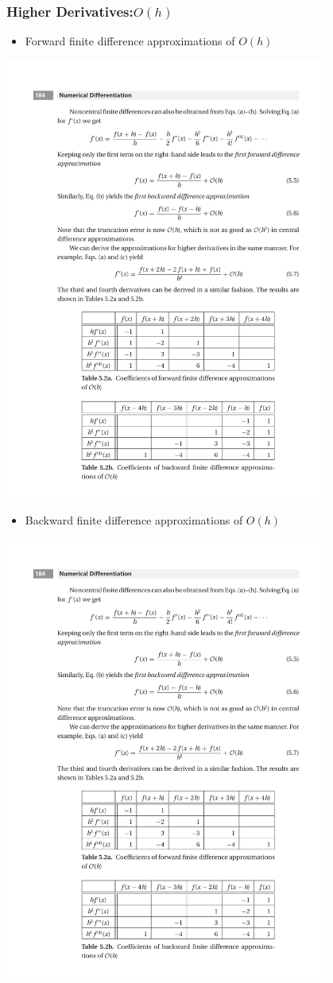 \documentclass{beamer}
\begin{document}
\begin{frame}[fragile]
\frametitle{Higher Derivatives:$O(h)$}

\begin{itemize}
\item Forward finite difference approximations of $O(h)$
\end{itemize}
\centerline{\includegraphics[width=0.8\textwidth]{Lec9_Tab1}}
\begin{itemize}
\item Backward finite difference approximations of $O(h)$
\end{itemize}
\centerline{\includegraphics[width=0.8\textwidth]{Lec9_Tab2}}



\end{frame}
\end{document}
